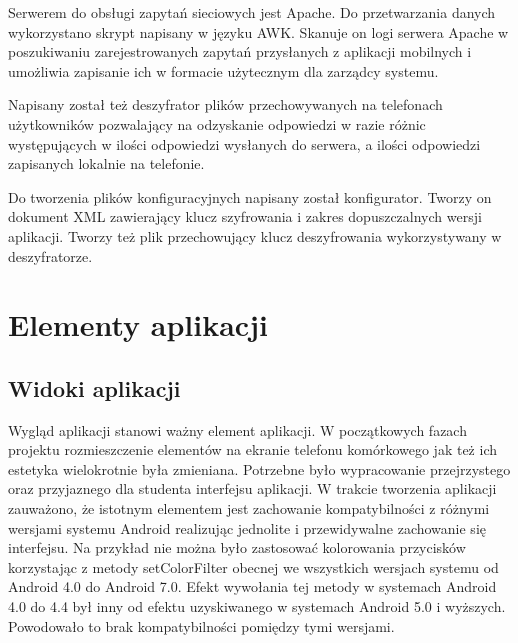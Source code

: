 \documentclass{report}
\begin{document}
	Serwerem do obsługi zapytań sieciowych jest Apache. Do przetwarzania danych wykorzystano skrypt napisany w języku AWK. Skanuje on logi serwera Apache w poszukiwaniu zarejestrowanych zapytań przysłanych z aplikacji mobilnych i umożliwia zapisanie ich w formacie użytecznym dla zarządcy systemu.
	
	Napisany został też deszyfrator plików przechowywanych na telefonach użytkowników pozwalający na odzyskanie odpowiedzi w razie różnic występujących w ilości odpowiedzi wysłanych do serwera, a ilości odpowiedzi zapisanych lokalnie na telefonie.
	
	Do tworzenia plików konfiguracyjnych napisany został konfigurator. Tworzy on dokument XML zawierający klucz szyfrowania i zakres dopuszczalnych wersji aplikacji. Tworzy też plik przechowujący klucz deszyfrowania wykorzystywany w deszyfratorze.
	
	\section{Elementy aplikacji}
	
		\subsection{Widoki aplikacji}
		
		Wygląd aplikacji stanowi ważny element aplikacji. W początkowych fazach projektu rozmieszczenie elementów na ekranie telefonu komórkowego jak też ich estetyka wielokrotnie była zmieniana. Potrzebne było wypracowanie przejrzystego oraz przyjaznego dla studenta interfejsu aplikacji. W trakcie tworzenia aplikacji zauważono, że istotnym elementem jest zachowanie kompatybilności z różnymi wersjami systemu Android realizując jednolite i przewidywalne zachowanie się interfejsu.
		Na przykład nie można było zastosować kolorowania przycisków korzystając z metody setColorFilter obecnej we wszystkich wersjach systemu od Android 4.0 do Android 7.0. Efekt wywołania tej metody w systemach Android 4.0 do 4.4 był inny od efektu uzyskiwanego w systemach Android 5.0 i wyższych. Powodowało to brak kompatybilności pomiędzy tymi wersjami.\\
		
\end{document}
